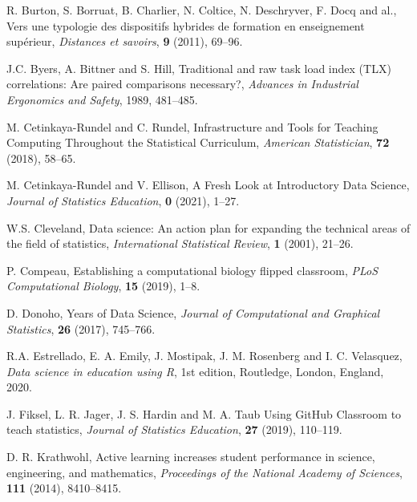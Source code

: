 \documentclass{aims} %
\theoremstyle{definition}
\begin{document}
\begin{thebibliography}{99}
     \newblock  R. Burton, S. Borruat, B. Charlier, N. Coltice, N. Deschryver, F. Docq and al.,
     \newblock Vers une typologie des dispositifs hybrides de formation en enseignement supérieur,
     \newblock \emph{Distances et savoirs}, \textbf{9} (2011), 69--96.

     \newblock  J.C. Byers, A. Bittner and S. Hill,
     \newblock Traditional and raw task load index (TLX) correlations: Are paired comparisons necessary?,
     \newblock \emph{Advances in Industrial Ergonomics and Safety}, 1989, 481--485.

     \newblock  M. Cetinkaya-Rundel and C. Rundel,
     \newblock Infrastructure and Tools for Teaching Computing Throughout the Statistical Curriculum,
     \newblock \emph{American Statistician}, \textbf{72} (2018), 58--65.

     \newblock  M. Cetinkaya-Rundel and V. Ellison,
     \newblock A Fresh Look at Introductory Data Science,
     \newblock \emph{Journal of Statistics Education}, \textbf{0} (2021), 1--27.

     \newblock W.S. Cleveland,
     \newblock Data science: An action plan for expanding the technical areas of the field of statistics,
     \newblock \emph{International Statistical Review}, \textbf{1} (2001), 21--26.

     \newblock P. Compeau,
     \newblock Establishing a computational biology flipped classroom,
     \newblock \emph{PLoS Computational Biology}, \textbf{15} (2019), 1--8.

     \newblock  D. Donoho,
      Years of Data Science,
     \newblock \emph{Journal of Computational and Graphical Statistics}, \textbf{26} (2017), 745--766.

     \newblock R.A. Estrellado, E. A. Emily, J. Mostipak, J. M. Rosenberg and I. C. Velasquez,
     \newblock \emph{Data science in education using R},
     \newblock 1st edition, Routledge, London, England, 2020.

     \newblock J. Fiksel, L. R. Jager, J. S. Hardin and M. A. Taub
     \newblock Using GitHub Classroom to teach statistics,
     \newblock \emph{Journal of Statistics Education}, \textbf{27} (2019), 110--119.

     \newblock  D. R. Krathwohl,
     \newblock Active learning increases student performance in science, engineering, and mathematics,
     \newblock \emph{Proceedings of the National Academy of Sciences}, \textbf{111} (2014), 8410--8415.


\end{thebibliography}
\end{document}
